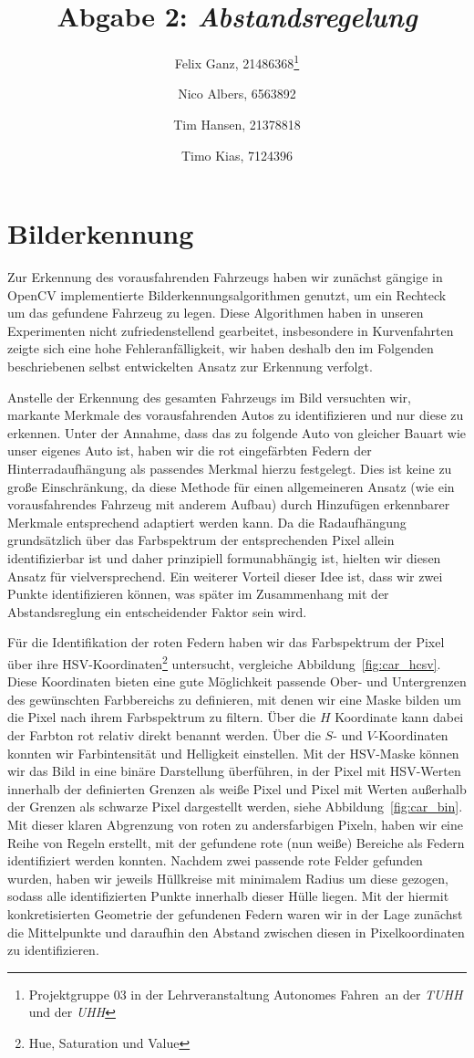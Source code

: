 \documentclass[10pt]{article}
\author{Felix Ganz, 21486368\thanks{Projektgruppe 03 in der Lehrveranstaltung \glqq{}Autonomes Fahren\grqq\ an der \emph{TUHH} und der \emph{UHH}}\and Nico Albers, 6563892\footnotemark[1] \and Tim Hansen, 21378818\footnotemark[1]\and Timo Kias, 7124396\footnotemark[1]}
\title{Abgabe 2: \emph{Abstandsregelung}}
\begin{document}
\maketitle

\section{Bilderkennung}
    Zur Erkennung des vorausfahrenden Fahrzeugs haben wir zunächst gängige in OpenCV implementierte Bilderkennungsalgorithmen genutzt, um ein Rechteck um das gefundene
    Fahrzeug zu legen.
    Diese Algorithmen haben in unseren Experimenten nicht zufriedenstellend gearbeitet, insbesondere in Kurvenfahrten zeigte sich eine hohe Fehleranfälligkeit, wir haben deshalb den im Folgenden beschriebenen selbst entwickelten Ansatz zur Erkennung verfolgt.

    Anstelle der Erkennung des gesamten Fahrzeugs im Bild versuchten wir, markante Merkmale des vorausfahrenden Autos zu identifizieren und nur diese zu erkennen.
    Unter der Annahme, dass das zu folgende Auto von gleicher Bauart wie unser eigenes Auto ist, haben wir die rot eingefärbten Federn der Hinterradaufhängung als passendes Merkmal hierzu festgelegt.
    Dies ist keine zu große Einschränkung, da diese Methode für einen allgemeineren Ansatz (wie ein vorausfahrendes Fahrzeug mit anderem Aufbau) durch Hinzufügen erkennbarer Merkmale entsprechend adaptiert werden kann.
    Da die Radaufhängung grundsätzlich über das Farbspektrum der entsprechenden Pixel allein identifizierbar ist und daher prinzipiell formunabhängig ist, hielten wir diesen Ansatz für vielversprechend.
    Ein weiterer Vorteil dieser Idee ist, dass wir zwei Punkte identifizieren können, was später im Zusammenhang mit der Abstandsreglung ein entscheidender Faktor sein wird.

    Für die Identifikation der roten Federn haben wir das Farbspektrum der Pixel über ihre HSV-Koordinaten\footnote{Hue, Saturation und Value} untersucht, vergleiche Abbildung~\ref{fig:car_hcsv}.  
    Diese Koordinaten bieten eine gute Möglichkeit passende Ober- und Untergrenzen des gewünschten Farbbereichs zu definieren, mit denen wir eine Maske bilden um die Pixel nach ihrem Farbspektrum zu filtern.
    Über die $H$ Koordinate kann dabei der Farbton rot relativ direkt benannt werden.
    Über die $S$- und $V$-Koordinaten konnten wir Farbintensität und Helligkeit einstellen.
    Mit der HSV-Maske können wir das Bild in eine binäre Darstellung überführen, in der Pixel mit HSV-Werten innerhalb der definierten Grenzen als weiße Pixel und Pixel mit Werten außerhalb der Grenzen als schwarze Pixel dargestellt werden, siehe Abbildung~\ref{fig:car_bin}.
    Mit dieser klaren Abgrenzung von roten zu andersfarbigen Pixeln, haben wir eine Reihe von Regeln erstellt, mit der gefundene rote (nun weiße) Bereiche als Federn identifiziert werden konnten.
    Nachdem zwei passende rote Felder gefunden wurden, haben wir jeweils Hüllkreise mit minimalem Radius um diese gezogen, sodass alle identifizierten Punkte innerhalb dieser Hülle liegen.
    Mit der hiermit konkretisierten Geometrie der gefundenen Federn waren wir in der Lage zunächst die Mittelpunkte und daraufhin den Abstand zwischen diesen in Pixelkoordinaten zu identifizieren.
    
\end{document}
